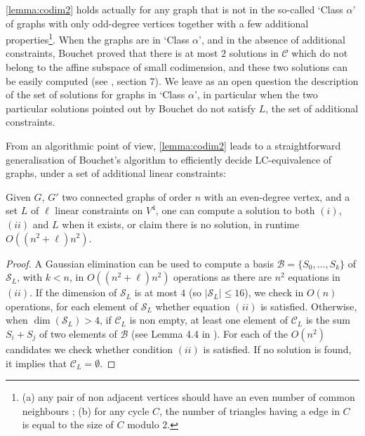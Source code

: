\documentclass[a4paper,UKenglish,cleveref,autoref,thm-restate]{arxiv}
\begin{document}
\begin{remark} \cref{lemma:codim2} holds actually for any graph that is not in the so-called `Class $\alpha$' of graphs with only odd-degree vertices together with a few additional properties\footnote{(a) any pair of non adjacent vertices should have an even number of common neighbours ; (b) for any cycle $C$, the number of triangles having a edge in $C$ is equal to the size of $C$ modulo $2$.}.  When the graphs are in  `Class $\alpha$', and in the absence of additional constraints, Bouchet proved that there is at most $2$ solutions in $\mathcal C$ which do not belong to the affine subspace of small codimension, and these two solutions can be easily computed (see \cite{Bouchet1991}, section 7).  We leave as an open question the description of the set of solutions for graphs in `Class $\alpha$', in particular when the two particular solutions pointed out by Bouchet do not satisfy $L$, the set of additional constraints. 
\end{remark}
From an algorithmic point of view, \cref{lemma:codim2} leads to a straightforward generalisation of Bouchet's algorithm to  efficiently decide LC-equivalence of graphs, under a set of additional linear constraints: 

\begin{proposition}\label{prop:extendedBouchet}
Given $G$, $G'$ two connected graphs of order $n$ with an even-degree vertex, and a set $L$ of $\ell$ linear constraints on $V^4$, one can compute a solution to both $(i)$, $(ii)$ and $L$ when it exists, or claim there is no solution, in runtime $O((n^2+\ell)n^2)$.
\end{proposition}

\begin{proof} 
A Gaussian elimination can be used to compute a basis $\mathcal B = \{S_0, \ldots , S_k\}$ of $\mathcal S_L$, with $k<n$, in $O((n^2+\ell)n^2)$ operations as there are $n^2$ equations in $(ii)$. If the dimension of $\mathcal S_L$ is at most $4$ (so $|\mathcal S_L|\le 16$), we check in $O(n)$ operations, for each element of $\mathcal S_L$ whether equation $(ii)$ is satisfied. Otherwise, when $\dim(\mathcal S_L)>4$, if $\mathcal C_L$ is non empty, at least one element of $\mathcal C_L$ is the sum $S_i +  S_j$ of two  elements of $\mathcal B$ (see Lemma 4.4 in \cite{Bouchet1991}). For each of the $O(n^2)$ candidates we check  whether condition $(ii)$ is satisfied.  If no solution is found, it implies that $\mathcal C_L=\emptyset$. 
\end{proof}
\end{document}
